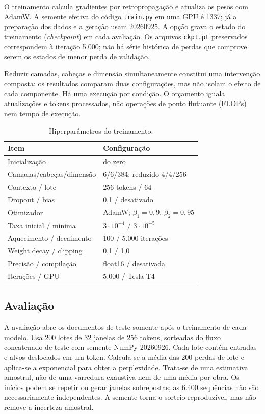 \documentclass[conference]{IEEEtran}
\begin{document}
O treinamento calcula gradientes por retropropagação e atualiza os pesos com AdamW. A semente efetiva do código \texttt{train.py} em uma GPU é 1337; já a preparação dos dados e a geração usam 20260925. A opção  grava o estado do treinamento (\textit{checkpoint}) em cada avaliação. Os arquivos \texttt{ckpt.pt} preservados correspondem à iteração 5.000; não há série histórica de perdas que comprove serem os estados de menor perda de validação.

Reduzir camadas, cabeças e dimensão simultaneamente constitui uma intervenção composta: os resultados comparam duas configurações, mas não isolam o efeito de cada componente. Há uma execução por condição. O orçamento iguala atualizações e tokens processados, não operações de ponto flutuante (FLOPs) nem tempo de execução.

\begin{table}[t]
\caption{Hiperparâmetros do treinamento.}
\label{tab:config}
\centering
\begin{tabular}{ll}
\toprule
Item & Configuração \\
\midrule
Inicialização & do zero \\
Camadas/cabeças/dimensão & 6/6/384; reduzido 4/4/256 \\
Contexto / lote & 256 tokens / 64 \\
Dropout / bias & 0,1 / desativado \\
Otimizador & AdamW; $\beta_1=0{,}9$, $\beta_2=0{,}95$ \\
Taxa inicial / mínima & $3\cdot10^{-4}$ / $3\cdot10^{-5}$ \\
Aquecimento / decaimento & 100 / 5.000 iterações \\
Weight decay / clipping & 0,1 / 1,0 \\
Precisão / compilação & float16 / desativada \\
Iterações / GPU & 5.000 / Tesla T4 \\
\bottomrule
\end{tabular}
\end{table}

\subsection{Avaliação}

A avaliação abre os documentos de teste somente após o treinamento de cada modelo. Usa 200 lotes de 32 janelas de 256 tokens, sorteadas do fluxo concatenado de teste com semente NumPy 20260926. Cada lote contém entradas e alvos deslocados em um token. Calcula-se a média das 200 perdas de lote e aplica-se a exponencial para obter a perplexidade. Trata-se de uma estimativa amostral, não de uma varredura exaustiva nem de uma média por obra. Os inícios podem se repetir ou gerar janelas sobrepostas; as 6.400 sequências não são necessariamente independentes. A semente torna o sorteio reproduzível, mas não remove a incerteza amostral.
\end{document}
